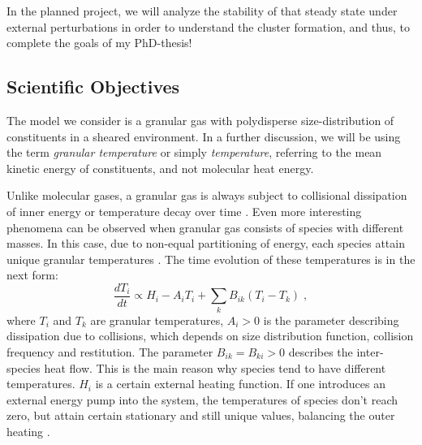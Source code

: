 \documentclass[11pt, notitlepage]{article} %
\begin{document}
In the planned project, we will analyze the stability of that steady state under external perturbations in order to understand the
cluster formation, and thus, to complete the goals of my PhD-thesis!\\

\subsection*{Scientific Objectives}

The model we consider is a granular gas with polydisperse size-distribution 
of constituents in a sheared environment. In a further discussion, we will be
using the term \emph{granular temperature} or simply \emph{temperature}, 
referring to the mean kinetic energy of constituents, and not molecular heat energy.

Unlike molecular gases, a granular gas is always subject to collisional dissipation of inner 
energy or temperature decay over time \cite{Haff1983,Brilliantov2004}. Even more interesting phenomena can be
observed when granular gas consists of species with different masses. In this case, 
due to non-equal partitioning of energy, each species attain unique granular 
temperatures \cite{Garzo2007c,Osinsky2020}. 
The time evolution of these temperatures is in the next form:
\begin{equation}
	\frac{dT_i}{dt} \propto H_i -A_iT_i+\sum_{k}B_{ik}(T_i-T_k)\;,
\end{equation}
where $T_i$ and $T_k$ are granular temperatures, $A_i>0$ is the parameter describing 
dissipation due to collisions, which depends on size distribution function, collision 
frequency and restitution. The parameter $B_{ik}=B_{ki}>0$ describes the inter-species 
heat flow. This is the main reason why species tend to have different temperatures. 
$H_i$ is a certain external heating function. If one introduces an external energy pump 
into the system, the temperatures of species don't reach zero, but attain certain 
stationary and still unique values, balancing the outer heating \cite{Bodrova2014}. 
\end{document}

